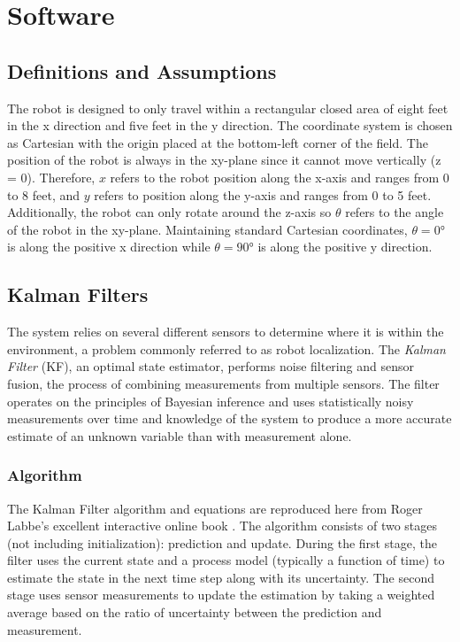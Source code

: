 \chapter{Software}

\section{Definitions and Assumptions}
The robot is designed to only travel within a rectangular closed area of eight feet in the x direction and five feet in the y direction. The coordinate system is chosen as Cartesian with the origin placed at the bottom-left corner of the field. The position of the robot is always in the xy-plane since it cannot move vertically (z = 0). Therefore, $x$ refers to the robot position along the x-axis and ranges from 0 to 8 feet, and $y$ refers to position along the y-axis and ranges from 0 to 5 feet. Additionally, the robot can only rotate around the z-axis so $\theta$ refers to the angle of the robot in the xy-plane. Maintaining standard Cartesian coordinates, $\theta=\ang{0}$ is along the positive x direction while $\theta=\ang{90}$ is along the positive y direction.

\section{Kalman Filters}
The system relies on several different sensors to determine where it is within the environment, a problem commonly referred to as robot localization. The \textit{Kalman Filter} (KF), an optimal state estimator, performs noise filtering and sensor fusion, the process of combining measurements from multiple sensors. The filter operates on the principles of Bayesian inference and uses statistically noisy measurements over time and knowledge of the system to produce a more accurate estimate of an unknown variable than with measurement alone.

\subsection{Algorithm}
The Kalman Filter algorithm and equations are reproduced here from Roger Labbe's excellent interactive online book \cite{labbe_2017}.  The algorithm consists of two stages (not including initialization): prediction and update. During the first stage, the filter uses the current state and a process model (typically a function of time) to estimate the state in the next time step along with its uncertainty. The second stage uses sensor measurements to update the estimation by taking a weighted average based on the ratio of uncertainty between the prediction and measurement. 

